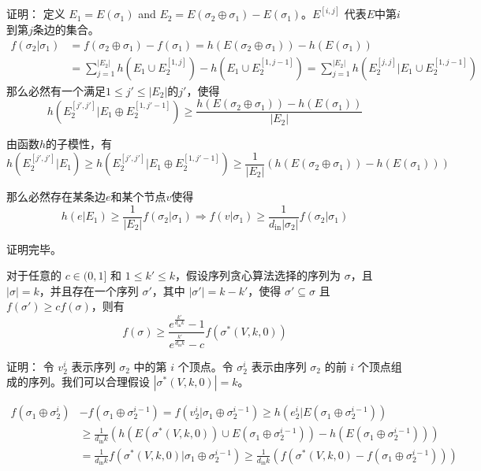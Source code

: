 证明：
定义 $E_1=E(\sigma_1)$ and $E_2=E(\sigma_2 \oplus \sigma_1)-E(\sigma_1)$。$E^{[i,j]}$ 代表$E$中第$i$到第$j$条边的集合。
\begin{align}
    f(\sigma_2|\sigma_1) & = f(\sigma_2 \oplus \sigma_1) - f(\sigma_1) = h(E(\sigma_2 \oplus \sigma_1)) - h(E(\sigma_1)) \\
    & = \sum^{|E_2|}_{j=1} h(E_1 \cup E_2^{[1,j]}) - h(E_1 \cup E_2^{[1,j-1]}) = \sum_{j=1}^{|E_2|} h(E_2^{[j,j]} | E_1 \cup E_2^{[1,j-1]})
\end{align}
那么必然有一个满足$1\le j' \le |E_2|$的$j'$，使得
\begin{equation}
    h(E_2^{[j',j']} | E_1 \oplus E_2^{[1,j'-1]}) \ge \frac{h(E(\sigma_2 \oplus \sigma_1)) - h(E(\sigma_1))}{|E_2|}   
\end{equation}

由函数$h$的子模性，有
\begin{equation}
h(E_2^{[j',j']} | E_1) \ge h(E_2^{[j',j']} | E_1 \oplus E_2^{[1,j'-1]}) \ge \frac{1}{|E_2|}(h(E(\sigma_2 \oplus \sigma_1)) - h(E(\sigma_1)))
\end{equation}

那么必然存在某条边$e$和某个节点$v$使得
\begin{equation}
h(e|E_1) \ge \frac{1}{|E_2|}f(\sigma_2|\sigma_1) \Longrightarrow
f(v|\sigma_1) \ge \frac{1}{d_{\text{in}}|\sigma_2|}f(\sigma_2|\sigma_1)
\end{equation}

证明完毕。

\begin{lemma}
\label{lem:lem2}
对于任意的 $c \in (0,1]$ 和 $1 \le k' \le k$，假设序列贪心算法选择的序列为 $\sigma$，且 $|\sigma| = k$，并且存在一个序列 $\sigma'$，其中 $|\sigma'| = k-k'$，使得 $\sigma' \subseteq \sigma$ 且 $f(\sigma') \ge c f(\sigma)$，则有
\begin{equation}
 f(\sigma) \ge \frac{e^{\frac{k'}{d_{\text{in}}k}}-1} {e^{\frac{k'}{d_{\text{in}}k}}-c} f(\sigma^*(V,k,0))
\end{equation}
\end{lemma}

证明：
令 $v_2^i$ 表示序列 $\sigma_2$ 中的第 $i$ 个顶点。令 $\sigma_2^i$ 表示由序列 $\sigma_2$ 的前 $i$ 个顶点组成的序列。我们可以合理假设 $|\sigma^*(V,k,0)|=k$。

\begin{align}
f(\sigma_1 \oplus \sigma_2^i) &- f(\sigma_1 \oplus \sigma_2^{i-1}) = f(v_2^i|\sigma_1 \oplus \sigma_2^{i-1}) \ge h(e_2^i|E(\sigma_1 \oplus \sigma_2^{i-1})) \label{equ:lem2_line1}\\
& \ge \frac{1}{d_{\text{in}}k} (h(E(\sigma^*(V,k,0)) \cup E(\sigma_1 \oplus \sigma_2^{i-1})) -h(E(\sigma_1 \oplus \sigma_2^{i-1}))) \label{equ:lem2_line2}\\
& = \frac{1}{d_{\text{in}}k} f(\sigma^*(V,k,0)|\sigma_1 \oplus \sigma_2^{i-1}) \ge \frac{1}{d_{\text{in}}k} (f(\sigma^*(V,k,0) - f(\sigma_1 \oplus \sigma_2^{i-1}))) \label{equ:lem2_line3}
\end{align}

